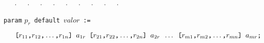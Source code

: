 \documentclass[11pt, brazil]{report}
\begin{document}
\verb|   |.\ \ \ .\ \ \ .\ \ \ .\ \ \ .\ \ \ .\ \ \ .\ \ \ .\ \ \ .

\verb|param| $p_r$\ \verb|default|\ $valor$\ \verb|:=|

$\verb|   |
\verb|[|r_{11}\verb|,|r_{12}\verb|,|\dots\verb|,|r_{1n}\verb|] |a_{1r}
\verb| [|r_{21}\verb|,|r_{22}\verb|,|\dots\verb|,|r_{2n}\verb|] |a_{2r}
\verb| |\dots
\verb| [|r_{m1}\verb|,|r_{m2}\verb|,|\dots\verb|,|r_{mn}\verb|] |a_{mr}
\verb|;|
$


%
%
%
%
%
%
%
%
%
%
%
%
\end{document}
